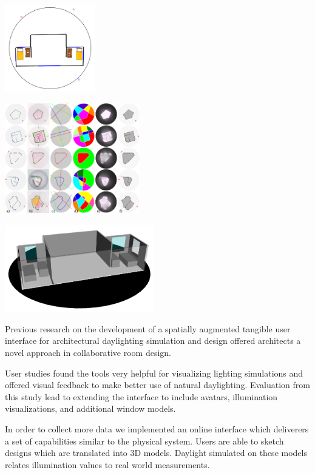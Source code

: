 \documentclass[landscape,final,a0paper,fontscale=0.285]{baposter}
\begin{document}
\begin{poster}
{  %
  {\includegraphics[height=10.25em]{img/oasis_1.png}}

  {\includegraphics[height=13em]{img/aag_figure_3.png}}


  {\includegraphics[height=10.25em]{img/oasis_2.png}} 

Previous research on the development of a spatially augmented tangible user interface for architectural daylighting simulation and design offered architects a novel approach in collaborative room design. \cite{NasmanEvaluation, ShengYYC09 }

User studies found the tools very helpful for visualizing lighting simulations and offered visual feedback to make better use of natural daylighting. Evaluation from this study lead to extending the interface to include avatars, illumination visualizations, and additional window models.\cite{NasmanEvaluation}

In order to collect more data we implemented an online interface which deliverers a set of capabilities similar to the physical system. Users are able to sketch designs which are translated into 3D models. Daylight simulated on these models relates illumination values to real world measurements.

}
\end{poster}
\end{document}

